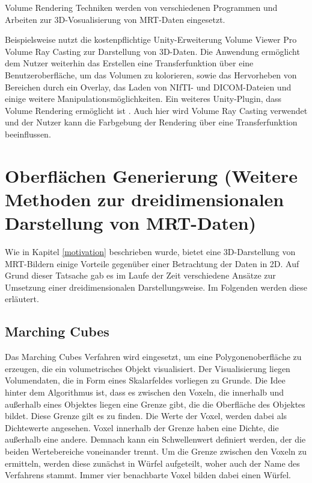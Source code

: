 Volume Rendering Techniken werden von verschiedenen Programmen und Arbeiten zur 3D-Vosualisierung von MRT-Daten eingesetzt.

Beispielsweise nutzt die kostenpflichtige Unity-Erweiterung Volume Viewer Pro Volume Ray Casting zur Darstellung von 3D-Daten. Die Anwendung ermöglicht dem Nutzer weiterhin das Erstellen eine Transferfunktion über eine Benutzeroberfläche, um das Volumen zu kolorieren, sowie das Hervorheben von Bereichen durch ein Overlay, das Laden von NIfTI- und DICOM-Dateien und einige weitere Manipulationsmöglichkeiten. 
\citet{volumeViewerPro}
Ein weiteres Unity-Plugin, dass Volume Rendering ermöglicht ist \citet{volumeRenderingUnity}. Auch hier wird Volume Ray Casting verwendet und der Nutzer kann die Farbgebung der Rendering über eine Transferfunktion beeinflussen.


\section{Oberflächen Generierung (Weitere Methoden zur dreidimensionalen Darstellung von MRT-Daten)}		 %
Wie in Kapitel \ref{motivation} beschrieben wurde, bietet eine 3D-Darstellung von MRT-Bildern einige Vorteile gegenüber einer Betrachtung der Daten in 2D. 
Auf Grund dieser Tatsache gab es im Laufe der Zeit verschiedene Ansätze zur Umsetzung einer dreidimensionalen Darstellungsweise. 
Im Folgenden werden diese erläutert. 



\subsection{Marching Cubes}
\label{marchingCubes}

Das Marching Cubes Verfahren wird eingesetzt, um eine Polygonenoberfläche zu erzeugen, die ein volumetrisches Objekt visualisiert. 
Der Visualisierung liegen Volumendaten, die in Form eines Skalarfeldes vorliegen zu Grunde.
Die Idee hinter dem Algorithmus ist, dass es zwischen den Voxeln, die innerhalb und außerhalb eines Objektes liegen eine Grenze gibt, die die Oberfläche des Objektes bildet. Diese Grenze gilt es zu finden. 
Die Werte der Voxel, werden dabei als Dichtewerte angesehen. Voxel innerhalb der Grenze haben eine Dichte, die außerhalb eine andere. Demnach kann ein Schwellenwert definiert werden, der die beiden Wertebereiche voneinander trennt.
Um die Grenze zwischen den Voxeln zu ermitteln, werden diese zunächst in Würfel aufgeteilt, woher auch der Name des Verfahrens stammt. Immer vier benachbarte Voxel bilden dabei einen Würfel.  


